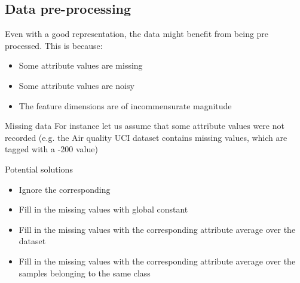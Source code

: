 \subsection{Data pre-processing}
Even with a good representation, the data might benefit from being pre processed. This is because:
\begin{itemize}
	\item Some attribute values are missing
    \item Some attribute values are noisy
    \item The feature dimensions are of incommensurate magnitude
\end{itemize}

\begin{parag}{Missing data}
    For instance let us assume that some attribute values were not recorded (e.g. the Air quality UCI dataset contains missing values, which are tagged with a -200 value)
	\begin{subparag}{Potential solutions}
		\begin{itemize}
			\item Ignore the corresponding
			\item Fill in the missing values with global constant
			\item Fill in the missing values with the corresponding attribute average over the dataset
			\item Fill in the missing values with the corresponding attribute average over the samples belonging to the same class
		\end{itemize}
		
	\end{subparag}
\end{parag}


